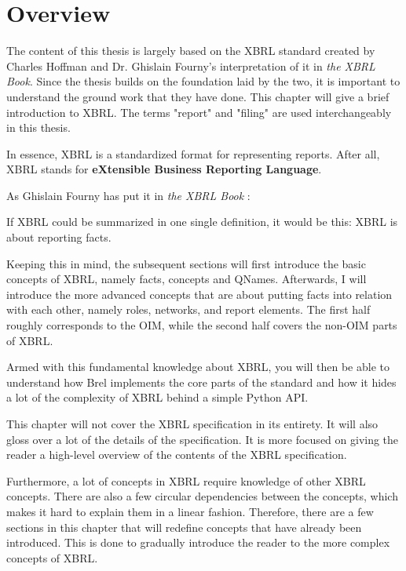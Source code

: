 \section{Overview}

The content of this thesis is largely based on the XBRL standard\cite{xbrl} created by Charles Hoffman and Dr. Ghislain Fourny's interpretation of it in \textit{the XBRL Book}\cite{fourny2023xbrl}.
Since the thesis builds on the foundation laid by the two, it is important to understand the ground work that they have done.
This chapter will give a brief introduction to XBRL.
The terms "report" and "filing" are used interchangeably in this thesis.

In essence, XBRL is a standardized format for representing reports.
After all, XBRL stands for \textbf{eXtensible Business Reporting Language}.\cite{xbrl}

As Ghislain Fourny has put it in \textit{the XBRL Book} \cite{fourny2023xbrl}:
\begin{displayquote}
    If XBRL could be summarized in one single definition, it would be this:
    XBRL is about reporting facts.
\end{displayquote}

Keeping this in mind, the subsequent sections will first introduce the basic concepts of XBRL, namely facts, concepts and QNames.
Afterwards, I will introduce the more advanced concepts that are about putting facts into relation with each other, namely roles, networks, and report elements.
The first half roughly corresponds to the OIM, while the second half covers the non-OIM parts of XBRL.

Armed with this fundamental knowledge about XBRL, 
you will then be able to understand how Brel implements the core parts of the standard and how it hides a lot of the complexity of XBRL behind a simple Python API.

This chapter will not cover the XBRL specification in its entirety.
It will also gloss over a lot of the details of the specification.
It is more focused on giving the reader a high-level overview of the contents of the XBRL specification.

Furthermore, a lot of concepts in XBRL require knowledge of other XBRL concepts.
There are also a few circular dependencies between the concepts, which makes it hard to explain them in a linear fashion.
Therefore, there are a few sections in this chapter that will redefine concepts that have already been introduced.
This is done to gradually introduce the reader to the more complex concepts of XBRL.

